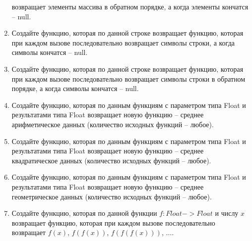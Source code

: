 \begin{enumerate}
		возвращает элементы массива в обратном порядке, а когда элементы кончатся -- null.
	\item Создайте функцию, которая по данной строке возвращает функцию, которая при каждом вызове последовательно
		возвращает символы строки, а когда символы кончатся -- null.
	\item Создайте функцию, которая по данной строке возвращает функцию, которая при каждом вызове последовательно
		возвращает символы строки в обратном порядке, а когда символы кончатся -- null.
	\item Создайте функцию, которая по данным функциям с параметром типа Float и результатами типа Float возвращает новую функцию -- среднее 
		арифметическое данных
		(количество исходных функций -- любое).
	\item Создайте функцию, которая по данным функциям с параметром типа Float и результатами типа Float возвращает новую функцию -- среднее 
		квадратическое данных
		(количество исходных функций -- любое).
	\item Создайте функцию, которая по данным функциям с параметром типа Float и результатами типа Float возвращает новую функцию -- среднее 
		геометрическое данных
		(количество исходных функций -- любое).
	\item Создайте функцию, которая по данной функции $f:Float->Float$ и числу $x$ возвращает функцию, которая 
		при каждом вызове последовательно возвращает $f(x)$, $f(f(x))$, $f(f(f(x)))$, $\dots$.

\end{enumerate}
